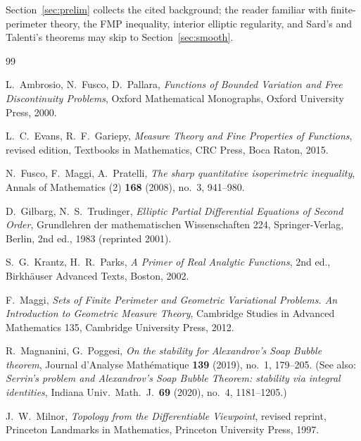 \documentclass[11pt]{article}
\theoremstyle{definition}
\begin{document}
Section~\ref{sec:prelim} collects the cited background; the reader familiar
with finite-perimeter theory, the FMP inequality, interior elliptic
regularity, and Sard's and Talenti's theorems may skip to
Section~\ref{sec:smooth}.

\bigskip


\bigskip


\bigskip


\bigskip


\bigskip


\begin{thebibliography}{99}

 L.~Ambrosio, N.~Fusco, D.~Pallara,
\emph{Functions of Bounded Variation and Free Discontinuity Problems},
Oxford Mathematical Monographs, Oxford University Press, 2000.

 L.~C.~Evans, R.~F.~Gariepy,
\emph{Measure Theory and Fine Properties of Functions}, revised edition,
Textbooks in Mathematics, CRC Press, Boca Raton, 2015.

 N.~Fusco, F.~Maggi, A.~Pratelli,
\emph{The sharp quantitative isoperimetric inequality},
Annals of Mathematics (2) \textbf{168} (2008), no.~3, 941--980.

 D.~Gilbarg, N.~S.~Trudinger,
\emph{Elliptic Partial Differential Equations of Second Order},
Grundlehren der mathematischen Wissenschaften 224, Springer-Verlag, Berlin,
2nd ed., 1983 (reprinted 2001).

 S.~G.~Krantz, H.~R.~Parks,
\emph{A Primer of Real Analytic Functions}, 2nd ed., Birkh\"auser Advanced
Texts, Boston, 2002.

 F.~Maggi,
\emph{Sets of Finite Perimeter and Geometric Variational Problems. An
Introduction to Geometric Measure Theory}, Cambridge Studies in Advanced
Mathematics 135, Cambridge University Press, 2012.

 R.~Magnanini, G.~Poggesi,
\emph{On the stability for Alexandrov's Soap Bubble theorem},
Journal d'Analyse Math\'ematique \textbf{139} (2019), no.~1, 179--205.
\textup{(}See also: \emph{Serrin's problem and Alexandrov's Soap Bubble
Theorem: stability via integral identities}, Indiana Univ.\ Math.\ J.\
\textbf{69} (2020), no.~4, 1181--1205.\textup{)}

 J.~W.~Milnor,
\emph{Topology from the Differentiable Viewpoint}, revised reprint,
Princeton Landmarks in Mathematics, Princeton University Press, 1997.


\end{thebibliography}
\end{document}
